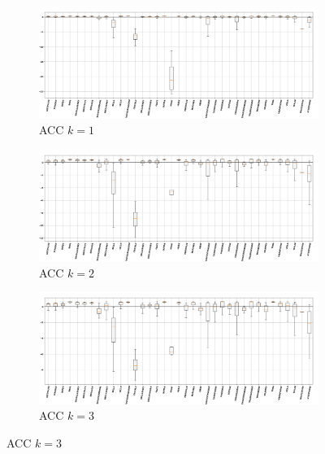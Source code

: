 \documentclass[12pt,letterpaper]{article}
\begin{document}
\begin{figure}[H]
\begin{center}

	\begin{subfigure}{1.0\textwidth}
	\centering
	\includegraphics[width=\textwidth , height=0.2\textheight]
		{../FiguresFeatures/ACC_1}
	\caption{ACC $k=1$}
	\end{subfigure}
	
	\begin{subfigure}{1.0\textwidth}
	\centering
	\includegraphics[width=\textwidth , height=0.2\textheight]
		{../FiguresFeatures/ACC_2}
	\caption{ACC $k=2$}
	\end{subfigure}
	
	\begin{subfigure}{1.0\textwidth}
	\centering
	\includegraphics[width=\textwidth , height=0.2\textheight]
		{../FiguresFeatures/ACC_3}
	\caption{ACC $k=3$}
	\end{subfigure}
	

\end{center}
\end{figure}
\end{document}
